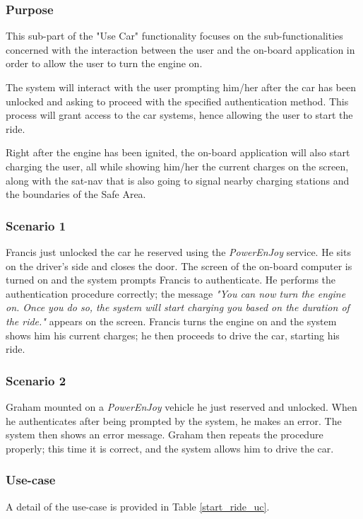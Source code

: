 \subsubsection{Purpose}
This sub-part of the "Use Car" functionality focuses on the sub-functionalities concerned with the interaction between the user and the on-board application in order to allow the user to turn the engine on.

The system will interact with the user prompting him/her after the car has been unlocked and asking to proceed with the specified authentication method. This process will grant access to the car systems, hence allowing the user to start the ride.

Right after the engine has been ignited, the on-board application will also start charging the user, all while showing him/her the current charges on the screen, along with the sat-nav that is also going to signal nearby charging stations and the boundaries of the Safe Area.

\subsubsection{Scenario 1}
Francis just unlocked the car he reserved using the \emph{PowerEnJoy} service. He sits on the driver's side and closes the door. The screen of the on-board computer is turned on and the system prompts Francis to authenticate. He performs the authentication procedure correctly; the message \emph{"You can now turn the engine on. Once you do so, the system will start charging you based on the duration of the ride."} appears on the screen. Francis turns the engine on and the system shows him his current charges; he then proceeds to drive the car, starting his ride.

\subsubsection{Scenario 2}
Graham mounted on a \emph{PowerEnJoy} vehicle he just reserved and unlocked. When he authenticates after being prompted by the system, he makes an error. The system then shows an error message. Graham then repeats the procedure properly; this time it is correct, and the system allows him to drive the car.

\subsubsection{Use-case}
A detail of the use-case is provided in Table \ref{start_ride_uc}.

